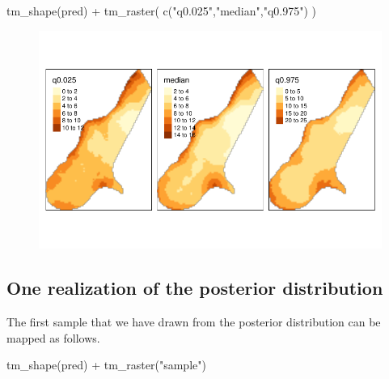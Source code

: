 \documentclass[
  a4paper,
]{article}
\newenvironment{Shaded}{\begin{snugshade}}{\end{snugshade}}
\newcommand{\FunctionTok}[1]{\textcolor[rgb]{0.28,0.35,0.67}{#1}}
\newcommand{\NormalTok}[1]{\textcolor[rgb]{0.00,0.23,0.31}{#1}}
\newcommand{\SpecialCharTok}[1]{\textcolor[rgb]{0.37,0.37,0.37}{#1}}
\newcommand{\StringTok}[1]{\textcolor[rgb]{0.13,0.47,0.30}{#1}}
\begin{document}
\begin{Shaded}
\begin{Highlighting}[]
\FunctionTok{tm\_shape}\NormalTok{(pred) }\SpecialCharTok{+}
  \FunctionTok{tm\_raster}\NormalTok{(}
    \FunctionTok{c}\NormalTok{(}\StringTok{"q0.025"}\NormalTok{,}\StringTok{"median"}\NormalTok{,}\StringTok{"q0.975"}\NormalTok{)}
\NormalTok{    )}
\end{Highlighting}
\end{Shaded}

\begin{figure}[H]

{\centering \includegraphics{pedometron_files/figure-pdf/unnamed-chunk-13-1.pdf}

}

\end{figure}

\hypertarget{one-realization-of-the-posterior-distribution}{%
\subsection{One realization of the posterior
distribution}\label{one-realization-of-the-posterior-distribution}}

The first sample that we have drawn from the posterior distribution can
be mapped as follows.

\begin{Shaded}
\begin{Highlighting}[]
\FunctionTok{tm\_shape}\NormalTok{(pred) }\SpecialCharTok{+} \FunctionTok{tm\_raster}\NormalTok{(}\StringTok{"sample"}\NormalTok{)}
\end{Highlighting}
\end{Shaded}
\end{document}

